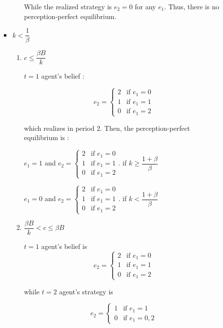 \documentclass{jsarticle}
\begin{document}
\begin{enumerate}
\begin{enumerate}
\begin{itemize}
\begin{enumerate}
 While the realized strategy is $e_2=0$ for any $e_1$. Thus, there is no perception-perfect equilibrium.
 
 \end{enumerate}

\item $k<\dfrac{1}{\beta}$

 \begin{enumerate}
 
 \item $c \leq \dfrac{\beta B}{k}$
 
 $t=1$ agent's belief :
 
 \[e_2 = \begin{cases}
 2 & \text{if } e_1=0 \\
 1 & \text{if } e_1=1 \\
 0 & \text{if } e_1=2
 \end{cases} \]
 
 which realizes in period 2. Then, the perception-perfect equilibrium is :
 
 \begin{center}
 
 $e_1=1$ and $e_2 = \begin{cases}
 2 & \text{if } e_1=0 \\
 1 & \text{if } e_1=1 \\
 0 & \text{if } e_1=2
 \end{cases} $. if $ k \geq \dfrac{1+\beta}{\beta}$
 
 $e_1=0$ and $e_2 = \begin{cases}
 2 & \text{if } e_1=0 \\
 1 & \text{if } e_1=1 \\
 0 & \text{if } e_1=2
 \end{cases} $. if $ k < \dfrac{1+\beta}{\beta}$
 
 \end{center}
 
 \item $\dfrac{\beta B}{k} < c \leq \beta B$
 
 $t=1$ agent's belief is
 \[e_2 = \begin{cases}
 2 & \text{if } e_1=0 \\
 1 & \text{if } e_1=1 \\
 0 & \text{if } e_1=2
 \end{cases} \]
 
 while $t=2$ agent's strategy is
 
 \[e_2 = \begin{cases}
 1 & \text{if } e_1=1 \\
 0 & \text{if } e_1=0,2
 \end{cases} \]
 

\end{enumerate}
\end{itemize}
\end{enumerate}
\end{enumerate}
\end{document}
